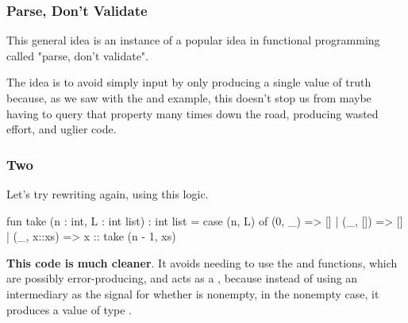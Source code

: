 \documentclass[aspectratio=169, handout]{beamer}
\begin{document}
\begin{frame}[fragile]
  \frametitle{Parse, Don't Validate}

  This general idea is an instance of a popular idea in functional programming
  called "parse, don't validate".

  \pause
  \vspace{\fill}


  \pause
  \vspace{\fill}

  The idea is to avoid simply  input by only producing a single
  value of truth because, as we saw with the  and 
  example, this doesn't stop us from maybe having to query that property many times
  down the road, producing wasted effort, and uglier code.

  \pause
  \vspace{\fill}

\end{frame}

\begin{frame}[fragile]
  \frametitle{ Two}

  Let's try rewriting  again, using this logic.

  \pause
  \begin{codeblock}
    fun take (n : int, L : int list) : int list =
      case (n, L) of
        (0, _)     => []
      | (_, [])    => []
      | (_, x::xs) => x :: take (n - 1, xs)
  \end{codeblock}

  \pause
  \vspace{\fill}

  \textbf{This code is much cleaner}. It avoids needing to use the  and
   functions, which are possibly error-producing, and acts as a
  , because instead of using an intermediary  as the
  signal for whether  is nonempty, in the nonempty case, it produces
  a value of type .
\end{frame}
\end{document}

